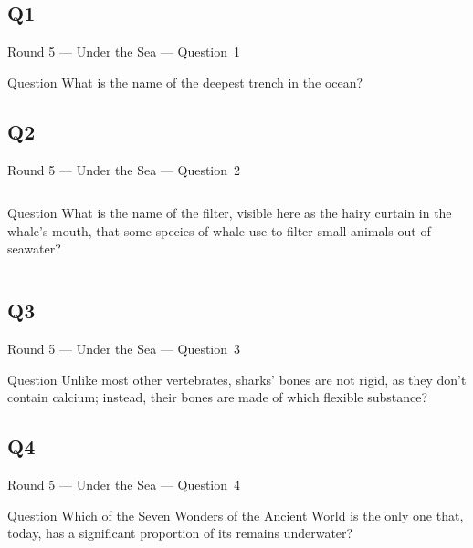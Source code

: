 \documentclass[11pt]{beamer}
\begin{document}
\subsection*{Q1}
\begin{frame}[t]{Round 5 --- Under the Sea --- \mbox{Question 1}}
\vspace{-0.5em}
\begin{block}{Question}
What is the name of the deepest trench in the ocean?
\end{block}
\end{frame}
\subsection*{Q2}
\begin{frame}[t]{Round 5 --- Under the Sea --- \mbox{Question 2}}
\vspace{-0.5em}
\begin{columns}[T,totalwidth=\linewidth]
\begin{column}{0.32\linewidth}
\begin{block}{Question}
What is the name of the filter, visible here as the hairy curtain in the whale's mouth, that some species of whale use to filter small animals out of seawater?
\end{block}
\end{column}
\begin{column}{0.65\linewidth}
\begin{center}
\texttt{[image: \{Images/baleen]}.jpg}
\end{center}
\end{column}
\end{columns}
\end{frame}
\subsection*{Q3}
\begin{frame}[t]{Round 5 --- Under the Sea --- \mbox{Question 3}}
\vspace{-0.5em}
\begin{block}{Question}
Unlike most other vertebrates, sharks' bones are not rigid, as they don't contain calcium; instead, their bones are made of which flexible substance?
\end{block}
\end{frame}
\subsection*{Q4}
\begin{frame}[t]{Round 5 --- Under the Sea --- \mbox{Question 4}}
\vspace{-0.5em}
\begin{block}{Question}
Which of the Seven Wonders of the Ancient World is the only one that, today, has a significant proportion of its remains underwater?
\end{block}
\end{frame}
\end{document}
